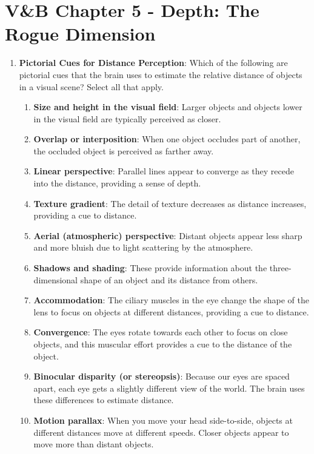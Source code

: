 \documentclass[11pt,letterpaper]{article}
\begin{document}
\section{V\&B Chapter 5 - Depth: The Rogue Dimension}
\begin{enumerate}
    \item \textbf{Pictorial Cues for Distance Perception}: Which of the following are pictorial cues that the brain uses to estimate the relative distance of objects in a visual scene? Select all that apply.
    \begin{enumerate}
        \item \textbf{Size and height in the visual field}: Larger objects and objects lower in the visual field are typically perceived as closer.
        \item \textbf{Overlap or interposition}: When one object occludes part of another, the occluded object is perceived as farther away.
        \item \textbf{Linear perspective}: Parallel lines appear to converge as they recede into the distance, providing a sense of depth.
        \item \textbf{Texture gradient}: The detail of texture decreases as distance increases, providing a cue to distance.
        \item \textbf{Aerial (atmospheric) perspective}: Distant objects appear less sharp and more bluish due to light scattering by the atmosphere.
        \item \textbf{Shadows and shading}: These provide information about the three-dimensional shape of an object and its distance from others.
        \item \textbf{Accommodation}: The ciliary muscles in the eye change the shape of the lens to focus on objects at different distances, providing a cue to distance.
        \item \textbf{Convergence}: The eyes rotate towards each other to focus on close objects, and this muscular effort provides a cue to the distance of the object.
        \item \textbf{Binocular disparity (or stereopsis)}: Because our eyes are spaced apart, each eye gets a slightly different view of the world. The brain uses these differences to estimate distance.
        \item \textbf{Motion parallax}: When you move your head side-to-side, objects at different distances move at different speeds. Closer objects appear to move more than distant objects.
    \end{enumerate}


\end{enumerate}
\end{document}
